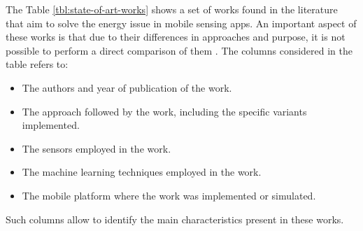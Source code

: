 


The Table \ref{tbl:state-of-art-works} shows a set of works found in the literature that aim to solve the energy issue in mobile sensing apps.
An important aspect of these works is that due to their differences in approaches and purpose, it is not possible to perform a direct comparison of them \cite{Vallina-Rodriguez2013}.
The columns considered in the table refers to:
\begin{itemize}
  \item The authors and year of publication of the work.
  \item The approach followed by the work, including the specific variants implemented.
  \item The sensors employed in the work.
  \item The machine learning techniques employed in the work.
  \item The mobile platform where the work was implemented or simulated.
\end{itemize}
Such columns allow to identify the main characteristics present in these works.


